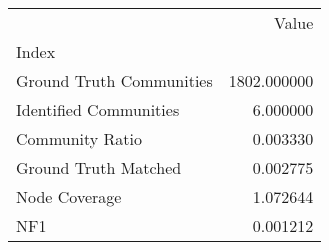 \begin{tabular}{lr}
\toprule
{} &        Value \\
Index                    &              \\
\midrule
Ground Truth Communities &  1802.000000 \\
Identified Communities   &     6.000000 \\
Community Ratio          &     0.003330 \\
Ground Truth Matched     &     0.002775 \\
Node Coverage            &     1.072644 \\
NF1                      &     0.001212 \\
\bottomrule
\end{tabular}
